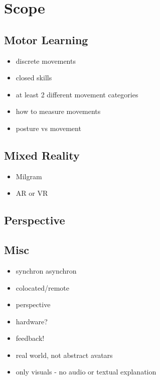 \chapter{Scope}
\section{Motor Learning}
\begin{itemize}
	\item discrete movements
	\item closed skills
	\item at least 2 different movement categories
	\item how to measure movements
	\item posture vs movement
\end{itemize}

\section{Mixed Reality}
\begin{itemize}
	\item Milgram
	\item AR or VR
\end{itemize}

\section{Perspective}


\section{Misc}
\begin{itemize}
	\item synchron asynchron
	\item colocated/remote
	\item perspective
	\item hardware?
	\item feedback!
	\item real world, not abstract avatars
	\item only visuals - no audio or textual explanation
\end{itemize}